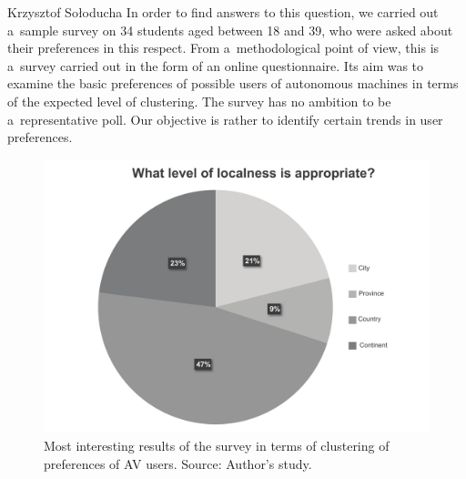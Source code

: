 \begin{artengenv}{Krzysztof Sołoducha}
In order to find answers to this question, we carried out a~sample survey on 34 students aged between 18 and 39, who were asked about their preferences in this respect. From a~methodological point of view, this is a~survey carried out in the form of an online questionnaire. Its aim was to examine the basic preferences of possible users of autonomous machines in terms of the expected level of clustering. The survey has no ambition to be a~representative poll. Our objective is rather to identify certain trends in user preferences.
\enlargethispage{2\baselineskip}
\begin{figure}[H]
 \begin{center}
 \includegraphics[width=.8\textwidth]{ART_Soloducha/illustration1.pdf}%
 \end{center}%
 \caption{Most interesting results of the survey in terms of clustering of preferences of AV users. Source: Author's study.}\label{sol-ill1}
\end{figure}


\end{artengenv}

